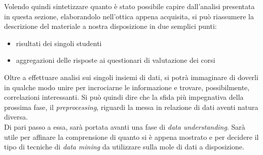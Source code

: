 Volendo quindi sintetizzare quanto è stato possibile capire dall'analisi presentata in questa sezione, elaborandolo nell'ottica appena acquisita, si può riassumere la descrizione del materiale a nostra disposizione in due semplici punti:

\begin{itemize}
	\item risultati dei singoli studenti
	\item aggregazioni delle risposte ai questionari di valutazione dei corsi
\end{itemize}

Oltre a effettuare analisi sui singoli insiemi di dati, si potrà immaginare di doverli in qualche modo unire per incrociarne le informazione e trovare, possibilmente, correlazioni interessanti. Si può quindi dire che la sfida più impegnativa della prossima fase, il \textit{preprocessing}, riguardi la messa in relazione di dati aventi natura diversa. \\

Di pari passo a essa, sarà portata avanti una fase di \textit{data understanding}. Sarà utile per affinare la comprensione di quanto si è appena mostrato e per decidere il tipo di tecniche di \textit{data mining} da utilizzare sulla mole di dati a disposizione.
